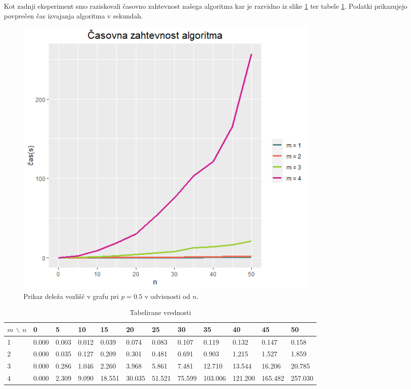 \documentclass[a4paper, 11pt]{article}
\theoremstyle{definition}
\theoremstyle{definition}
\begin{document}
Kot zadnji eksperiment smo raziskovali časovno zahtevnost našega algoritma kar je 
razvidno iz slike \ref{fig:cas} ter tabele \ref{tab:cas}.
Podatki prikazujejo povprečen čas izvajanja algoritma v sekundah. 


\begin{figure}[h]
    \centering
    \includegraphics[width=0.75\textwidth]{cas.png}
    \caption{Prikaz deleža vozlišč v grafu pri $p=0.5$ v
    odvisnosti od $n$.}
    \label{fig:cas}
\end{figure}

\begin{table}[!ht]
    \caption{Tabelirane vrednosti}
    \label{tab:cas}
    \begin{adjustwidth}{-2cm}{}
    \begin{tabular}{|l|l|l|l|l|l|l|l|l|l|l|l|}
    \hline
        $m$ $\backslash$ $n$ & 0 & 5 & 10 & 15 & 20 & 25 & 30 & 35 & 40 & 45 & 50 \\ \hline
        1 & 0.000 & 0.003 & 0.012 & 0.039 & 0.074 & 0.083 & 0.107 & 0.119 & 0.132 & 0.147 & 0.158 \\ \hline
        2 & 0.000 & 0.035 & 0.127 & 0.209 & 0.301 & 0.481 & 0.691 & 0.903 & 1.215 & 1.527 & 1.859 \\ \hline
        3 & 0.000 & 0.286 & 1.046 & 2.260 & 3.968 & 5.861 & 7.481 & 12.710 & 13.544 & 16.206 & 20.785 \\ \hline
        4 & 0.000 & 2.309 & 9.090 & 18.551 & 30.035 & 51.521 & 75.599 & 103.006 & 121.200 & 165.482 & 257.030 \\ \hline
    \end{tabular}
    \end{adjustwidth}
\end{table}
\end{document}
